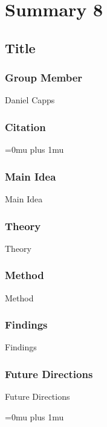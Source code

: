 \section{Summary 8}

\noindent
\subsection{Title}

\subsubsection{Group Member}

\noindent
Daniel Capps

\noindent
\subsubsection{Citation}

\Urlmuskip=0mu plus 1mu\relax

\subsubsection{Main Idea}

\noindent
Main Idea

\subsubsection{Theory}

\noindent
Theory

\subsubsection{Method}

\noindent
Method

\subsubsection{Findings}

\noindent
Findings

\subsubsection{Future Directions}

\noindent
Future Directions 

\Urlmuskip=0mu plus 1mu\relax

